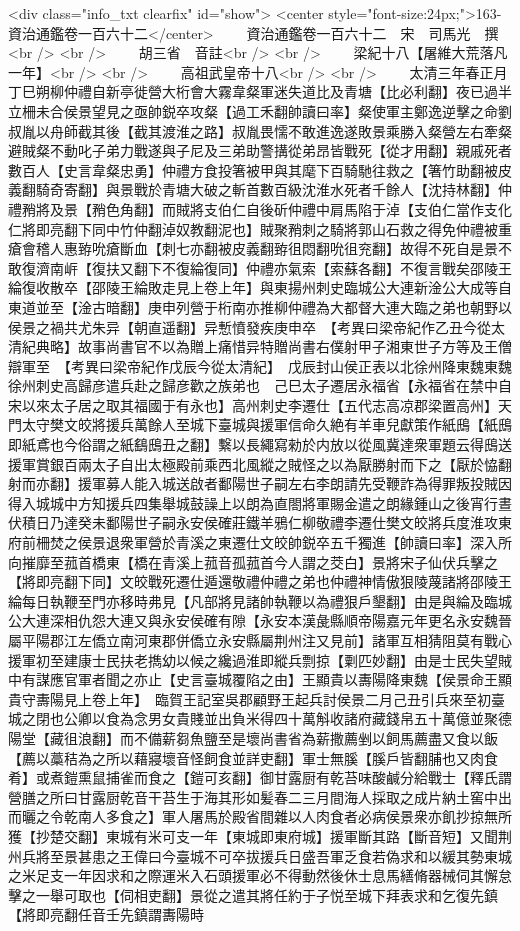 <div class="info_txt clearfix" id="show">
<center style="font-size:24px;">163-資治通鑑卷一百六十二</center>
  　　資治通鑑卷一百六十二　宋　司馬光　撰<br />
<br />
　　胡三省　音註<br />
<br />
　　梁紀十八【屠維大荒落凡一年】<br />
<br />
　　高祖武皇帝十八<br />
<br />
　　太清三年春正月丁巳朔柳仲禮自新亭徙營大桁會大霧韋粲軍迷失道比及青塘【比必利翻】夜已過半立柵未合侯景望見之亟帥鋭卒攻粲【過工禾翻帥讀曰率】粲使軍主鄭逸逆擊之命劉叔胤以舟師截其後【截其渡淮之路】叔胤畏懦不敢進逸遂敗景乘勝入粲營左右牽粲避賊粲不動叱子弟力戰遂與子尼及三弟助警搆從弟昂皆戰死【從才用翻】親戚死者數百人【史言韋粲忠勇】仲禮方食投箸被甲與其麾下百騎馳往救之【箸竹助翻被皮義翻騎奇寄翻】與景戰於青塘大破之斬首數百級沈淮水死者千餘人【沈持林翻】仲禮矟將及景【矟色角翻】而賊將支伯仁自後斫仲禮中肩馬陷于淖【支伯仁當作支化仁將即亮翻下同中竹仲翻淖奴教翻泥也】賊聚矟刺之騎將郭山石救之得免仲禮被重瘡會稽人惠臶吮瘡斷血【刺七亦翻被皮義翻臶徂悶翻吮徂兖翻】故得不死自是景不敢復濟南㟁【復扶又翻下不復綸復同】仲禮亦氣索【索蘇各翻】不復言戰矣邵陵王綸復收散卒【邵陵王綸敗走見上卷上年】與東揚州刺史臨城公大連新淦公大成等自東道並至【淦古暗翻】庚申列營于桁南亦推柳仲禮為大都督大連大臨之弟也朝野以侯景之禍共尤朱异【朝直遥翻】异慙憤發疾庚申卒　【考異曰梁帝紀作乙丑今從太清紀典略】故事尚書官不以為贈上痛惜异特贈尚書右僕射甲子湘東世子方等及王僧辯軍至　【考異曰梁帝紀作戊辰今從太清紀】　戊辰封山侯正表以北徐州降東魏東魏徐州刺史高歸彦遣兵赴之歸彦歡之族弟也　己巳太子遷居永福省【永福省在禁中自宋以來太子居之取其福國于有永也】高州刺史李遷仕【五代志高凉郡梁置高州】天門太守樊文皎將援兵萬餘人至城下臺城與援軍信命久絶有羊車兒獻策作紙䲭【紙䲭即紙鳶也今俗謂之紙鷂䲭丑之翻】繫以長繩寫勑於内放以從風冀達衆軍題云得䲭送援軍賞銀百兩太子自出太極殿前乘西北風縱之賊怪之以為厭勝射而下之【厭於恊翻射而亦翻】援軍募人能入城送啟者鄱陽世子嗣左右李朗請先受鞭詐為得罪叛投賊因得入城城中方知援兵四集舉城鼓譟上以朗為直閤將軍賜金遣之朗緣鍾山之後宵行晝伏積日乃達癸未鄱陽世子嗣永安侯確莊鐵羊鴉仁柳敬禮李遷仕樊文皎將兵度淮攻東府前柵焚之侯景退衆軍營於青溪之東遷仕文皎帥鋭卒五千獨進【帥讀曰率】深入所向摧靡至菰首橋東【橋在青溪上菰音孤菰首今人謂之茭白】景將宋子仙伏兵擊之【將即亮翻下同】文皎戰死遷仕遁還敬禮仲禮之弟也仲禮神情傲狠陵蔑諸將邵陵王綸每日執鞭至門亦移時弗見【凡部將見諸帥執鞭以為禮狠戶墾翻】由是與綸及臨城公大連深相仇怨大連又與永安侯確有隙【永安本漢彘縣順帝陽嘉元年更名永安魏晉屬平陽郡江左僑立南河東郡併僑立永安縣屬荆州注又見前】諸軍互相猜阻莫有戰心援軍初至建康士民扶老擕幼以候之纔過淮即縱兵剽掠【㔄匹妙翻】由是士民失望賊中有謀應官軍者聞之亦止【史言臺城覆陷之由】王顯貴以夀陽降東魏【侯景命王顯貴守夀陽見上卷上年】　臨賀王記室吳郡顧野王起兵討侯景二月己丑引兵來至初臺城之閉也公卿以食為念男女貴賤並出負米得四十萬斛收諸府藏錢帛五十萬億並聚德陽堂【藏徂浪翻】而不備薪芻魚鹽至是壞尚書省為薪撒薦剉以飼馬薦盡又食以飯【薦以藁秸為之所以藉寢壞音怪飼食並詳吏翻】軍士無膎【膎戶皆翻脯也又肉食肴】或煮鎧熏鼠捕雀而食之【鎧可亥翻】御甘露厨有乾苔味酸鹹分給戰士【釋氏謂營膳之所曰甘露厨乾音干苔生于海其形如髪春二三月間海人採取之成片納土窖中出而曬之令乾南人多食之】軍人屠馬於殿省間雜以人肉食者必病侯景衆亦飢抄掠無所獲【抄楚交翻】東城有米可支一年【東城即東府城】援軍斷其路【斷音短】又聞荆州兵將至景甚患之王偉曰今臺城不可卒拔援兵日盛吾軍乏食若偽求和以緩其勢東城之米足支一年因求和之際運米入石頭援軍必不得動然後休士息馬繕脩器械伺其懈怠擊之一舉可取也【伺相吏翻】景從之遣其將任約于子悦至城下拜表求和乞復先鎮【將即亮翻任音壬先鎮謂夀陽時